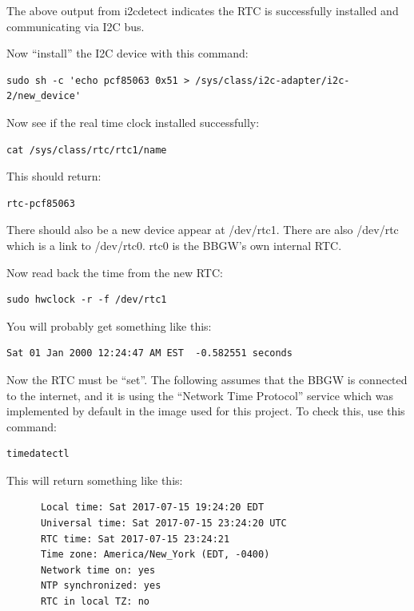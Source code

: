 The above output from i2cdetect indicates the RTC is successfully installed and communicating via I2C bus.

Now ``install'' the I2C device with this command:

\begin{verbatim}
sudo sh -c 'echo pcf85063 0x51 > /sys/class/i2c-adapter/i2c-2/new_device'
\end{verbatim}

Now see if the real time clock installed successfully:

\begin{verbatim}
cat /sys/class/rtc/rtc1/name
\end{verbatim}

This should return:

\begin{verbatim}
rtc-pcf85063
\end{verbatim}

There should also be a new device appear at /dev/rtc1.  There are also /dev/rtc which is a link to /dev/rtc0.  rtc0 is the BBGW's own internal RTC.

Now read back the time from the new RTC:

\begin{verbatim}
sudo hwclock -r -f /dev/rtc1
\end{verbatim}

You will probably get something like this:

\begin{verbatim}
Sat 01 Jan 2000 12:24:47 AM EST  -0.582551 seconds
\end{verbatim}

Now the RTC must be ``set''.  The following assumes that the BBGW is connected to the internet, and it is using the ``Network Time Protocol'' service which was implemented by default in the image used for this project.
To check this, use this command:

\begin{verbatim}
timedatectl
\end{verbatim}

This will return something like this:

\begin{verbatim}
      Local time: Sat 2017-07-15 19:24:20 EDT
      Universal time: Sat 2017-07-15 23:24:20 UTC
      RTC time: Sat 2017-07-15 23:24:21
      Time zone: America/New_York (EDT, -0400)
      Network time on: yes
      NTP synchronized: yes
      RTC in local TZ: no
\end{verbatim}

